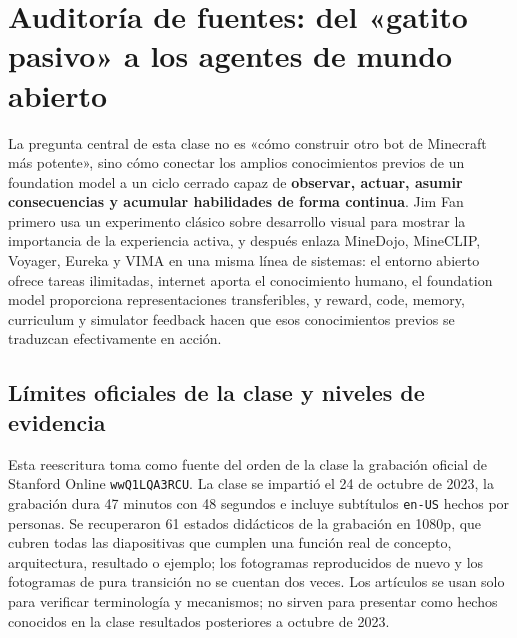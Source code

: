 \documentclass[a4paper]{article}
\begin{document}
\makecscover

\section{Auditoría de fuentes: del «gatito pasivo» a los agentes de mundo abierto}

La pregunta central de esta clase no es «cómo construir otro bot de Minecraft más potente», sino cómo conectar los amplios conocimientos previos de un foundation model a un ciclo cerrado capaz de \textbf{observar, actuar, asumir consecuencias y acumular habilidades de forma continua}. Jim Fan primero usa un experimento clásico sobre desarrollo visual para mostrar la importancia de la experiencia activa, y después enlaza MineDojo, MineCLIP, Voyager, Eureka y VIMA en una misma línea de sistemas: el entorno abierto ofrece tareas ilimitadas, internet aporta el conocimiento humano, el foundation model proporciona representaciones transferibles, y reward, code, memory, curriculum y simulator feedback hacen que esos conocimientos previos se traduzcan efectivamente en acción.

\subsection{Límites oficiales de la clase y niveles de evidencia}

Esta reescritura toma como fuente del orden de la clase la grabación oficial de Stanford Online \texttt{wwQ1LQA3RCU}. La clase se impartió el 24 de octubre de 2023, la grabación dura 47 minutos con 48 segundos e incluye subtítulos \texttt{en-US} hechos por personas. Se recuperaron 61 estados didácticos de la grabación en 1080p, que cubren todas las diapositivas que cumplen una función real de concepto, arquitectura, resultado o ejemplo; los fotogramas reproducidos de nuevo y los fotogramas de pura transición no se cuentan dos veces. Los artículos se usan solo para verificar terminología y mecanismos; no sirven para presentar como hechos conocidos en la clase resultados posteriores a octubre de 2023.
\end{document}
